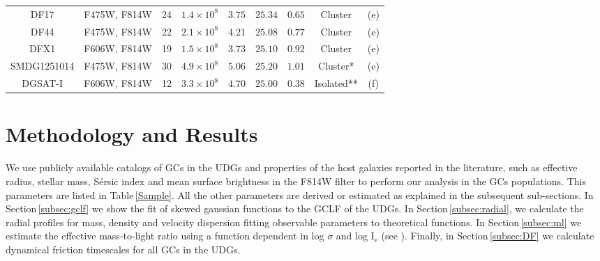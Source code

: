 \documentclass[baaa]{baaa}
\begin{document}
\begin{table*}[]
\begin{tabular}{ccccccccc}
         DF17       &F475W, F814W & 24 &$1.4\times 10^{8} $  &$3.75 $ &$25.34 $ & $0.65$&Cluster & (e) \\
         DF44       &F475W, F814W & 22 &$2.1\times 10^{8} $  &$4.21 $ &$25.08 $ & $0.77$&Cluster & (e) \\
         DFX1       &F606W, F814W & 19 &$1.5\times 10^{8} $  &$3.73 $ &$25.10 $ & $0.92$&Cluster & (e) \\
         SMDG1251014& F475W, F814W& 30 &$4.9\times 10^{8} $  &$5.06 $ &$25.20 $ & $1.01$&Cluster*& (e) \\
         DGSAT-I    & F606W, F814W& 12 &$3.3\times 10^{8} $  &$4.70 $ &$25.00 $ & $0.38$&Isolated** & (f) \\
         \hline
    \end{tabular} 

\end{table*}


\section{Methodology and Results}\label{sec:methods}
We use publicly available catalogs of GCs in the UDGs and properties of the host galaxies reported in the literature, such as effective radius, stellar mass, S\'ersic index and mean surface brightness in the F814W filter to perform our analysis in the GCs populations. This parameters are listed in Table\,\ref{Sample}. All the other parameters are derived or estimated as explained in the subsequent sub-sections. In Section\,\ref{subsec:gclf} we show the fit of skewed gaussian functions to the GCLF of the UDGs. In Section\,\ref{subsec:radial}, we calculate the radial profiles for mass, density and velocity dispersion fitting observable parameters to theoretical functions. In Section\,\ref{subsec:ml} we estimate the effective mass-to-light ratio using a function dependent in log $\sigma$ and log I$_\text{e}$ (see \citealt{Zaritsky2022_mass_estimation}). Finally, in Section\,\ref{subsec:DF} we calculate dynamical friction timescales for all GCs in the UDGs.
\end{document}

